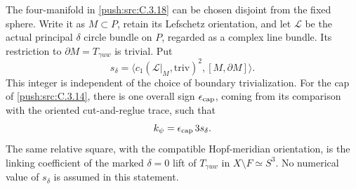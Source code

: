 \begin{proposition}\label{push:src:C.3.20}
The four-manifold in \ref{push:src:C.3.18} can be chosen disjoint from the fixed
sphere. Write it as $M\subset P$, retain its Lefschetz orientation,
and let $\mathcal L$ be the actual principal $\delta$ circle bundle
on $P$, regarded as a complex line bundle. Its restriction to
$\partial M=T_{\gamma uw}$ is trivial. Put
\[
 s_\delta=\langle c_1(\mathcal L|_M,\mathrm{triv})^2,
                         [M,\partial M]\rangle.
\]
This integer is independent of the choice of boundary trivialization.
For the cap of \ref{push:src:C.3.14}, there is one overall sign $\epsilon_{\rm cap}$,
coming from its comparison with the oriented cut-and-reglue trace,
such that
\[
 k_\psi=\epsilon_{\rm cap}\,3s_\delta.
\]
The same relative square, with the compatible Hopf-meridian
orientation, is the linking coefficient of the marked
$\delta=0$ lift of $T_{\gamma uw}$ in $X\setminus F\simeq S^3$.
No numerical value of $s_\delta$ is assumed in this statement.
\end{proposition}
